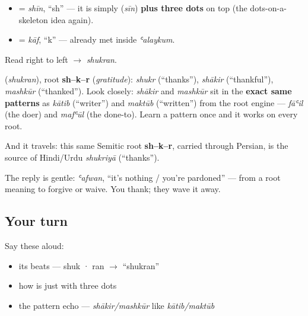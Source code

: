 \begin{itemize}
\raggedright
  \item \textbf{} = \emph{shīn}, \textquotedblleft{}sh\textquotedblright{} — it is simply \textbf{} (\emph{sīn}) \textbf{plus three dots} on top (the dots-on-a-skeleton idea again).
  \item \textbf{} = \emph{kāf}, \textquotedblleft{}k\textquotedblright{} — already met inside \emph{ʿalaykum}.
\end{itemize}

Read \textbf{} right to left $\to$ \emph{shukran}.

\begin{cousinweb}
\textbf{} (\emph{shukran}), root \textbf{sh–k–r} (\emph{gratitude}): \emph{shukr} (\textquotedblleft{}thanks\textquotedblright{}), \emph{shākir} (\textquotedblleft{}thankful\textquotedblright{}), \emph{mashkūr} (\textquotedblleft{}thanked\textquotedblright{}). Look closely: \emph{shākir} and \emph{mashkūr} sit in the \textbf{exact same patterns} as \emph{kātib} (\textquotedblleft{}writer\textquotedblright{}) and \emph{maktūb} (\textquotedblleft{}written\textquotedblright{}) from the root engine — \emph{fāʿil} (the doer) and \emph{mafʿūl} (the done-to). Learn a pattern once and it works on every root.

And it travels: this same Semitic root \textbf{sh–k–r}, carried through Persian, is the source of Hindi/Urdu \emph{shukriyā} (\textquotedblleft{}thanks\textquotedblright{}).
\end{cousinweb}

\begin{culture}
The reply is gentle: \emph{ʿafwan}, \textquotedblleft{}it's nothing / you're pardoned\textquotedblright{} — from a root meaning to forgive or waive. You thank; they wave it away.
\end{culture}

\subsection*{Your turn}
Say these aloud:

\begin{itemize}
\raggedright
  \item its beats — shuk · ran $\to$ \textquotedblleft{}shukran\textquotedblright{}
  \item how  is just  with three dots
  \item the pattern echo — \emph{shākir/mashkūr} like \emph{kātib/maktūb}
\end{itemize}

